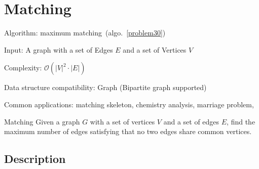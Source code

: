 \documentclass{article}
\begin{document}
\fi

%
%

\def\pbname{Matching} %

\section{\pbname} 

\begin{overview}
\item [Algorithm:] maximum matching~(algo.~\ref{problem30}) 
\item [Input:] A graph with a set of Edges $E$ and a set of Vertices $V$
\item [Complexity:] $\mathcal{O}(|V|^2\cdot |E|)$
\item [Data structure compatibility:] Graph (Bipartite graph supported)
\item [Common applications:] matching skeleton, chemistry analysis, marriage problem, 
\end{overview}



\begin{problem}{\pbname}
	Given a graph $G$ with a set of vertices $V$ and a set of edges $E$, find the maximum number of edges satisfying that no two edges share common vertices.
\end{problem}

\subsection*{Description}
\end{document}
